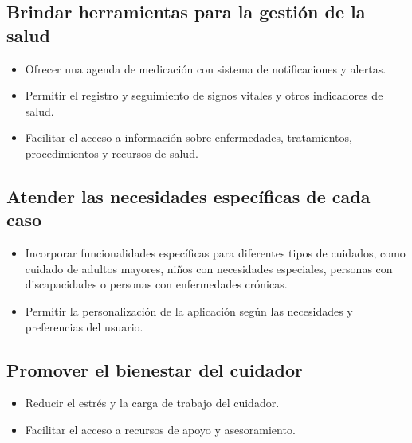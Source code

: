 \documentclass[a4paper,12pt]{article}
\begin{document}
    \subsection{Brindar herramientas para la gestión de la salud}
    \begin{itemize}
        \item Ofrecer una agenda de medicación con sistema de notificaciones y alertas.
        \item Permitir el registro y seguimiento de signos vitales y otros indicadores de salud.
        \item Facilitar el acceso a información sobre enfermedades, tratamientos, procedimientos y recursos de salud.
    \end{itemize}
    \subsection{Atender las necesidades específicas de cada caso}
    \begin{itemize}
        \item Incorporar funcionalidades específicas para diferentes tipos de cuidados, como cuidado de adultos mayores, niños con necesidades especiales, personas con discapacidades o personas con enfermedades crónicas.
        \item Permitir la personalización de la aplicación según las necesidades y preferencias del usuario.
    \end{itemize}
    \subsection{Promover el bienestar del cuidador}
    \begin{itemize}
        \item Reducir el estrés y la carga de trabajo del cuidador.
        \item Facilitar el acceso a recursos de apoyo y asesoramiento.
    \end{itemize}

    \newpage
    
\end{document}
